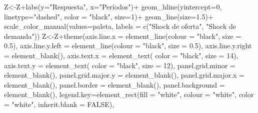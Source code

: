\documentclass[
]{book}
\newenvironment{Shaded}{\begin{snugshade}}{\end{snugshade}}
\newcommand{\AttributeTok}[1]{\textcolor[rgb]{0.77,0.63,0.00}{#1}}
\newcommand{\ConstantTok}[1]{\textcolor[rgb]{0.00,0.00,0.00}{#1}}
\newcommand{\DecValTok}[1]{\textcolor[rgb]{0.00,0.00,0.81}{#1}}
\newcommand{\FloatTok}[1]{\textcolor[rgb]{0.00,0.00,0.81}{#1}}
\newcommand{\FunctionTok}[1]{\textcolor[rgb]{0.00,0.00,0.00}{#1}}
\newcommand{\NormalTok}[1]{#1}
\newcommand{\OtherTok}[1]{\textcolor[rgb]{0.56,0.35,0.01}{#1}}
\newcommand{\SpecialCharTok}[1]{\textcolor[rgb]{0.00,0.00,0.00}{#1}}
\newcommand{\StringTok}[1]{\textcolor[rgb]{0.31,0.60,0.02}{#1}}
\begin{document}
\begin{Shaded}
\begin{Highlighting}[]
\NormalTok{Z}\OtherTok{\textless{}{-}}\NormalTok{Z}\SpecialCharTok{+}\FunctionTok{labs}\NormalTok{(}\AttributeTok{y=}\StringTok{"Respuesta"}\NormalTok{,}
          \AttributeTok{x=}\StringTok{"Períodos"}\NormalTok{)}\SpecialCharTok{+}
  \FunctionTok{geom\_hline}\NormalTok{(}\AttributeTok{yintercept=}\DecValTok{0}\NormalTok{, }\AttributeTok{linetype=}\StringTok{"dashed"}\NormalTok{,}
             \AttributeTok{color =} \StringTok{"black"}\NormalTok{, }\AttributeTok{size=}\DecValTok{1}\NormalTok{)}\SpecialCharTok{+}
  \FunctionTok{geom\_line}\NormalTok{(}\AttributeTok{size=}\FloatTok{1.5}\NormalTok{)}\SpecialCharTok{+}
  \FunctionTok{scale\_color\_manual}\NormalTok{(}\AttributeTok{values=}\NormalTok{paleta,}
                     \AttributeTok{labels =} \FunctionTok{c}\NormalTok{(}\StringTok{"Shock de oferta"}\NormalTok{, }
                                \StringTok{"Shock de demanda"}\NormalTok{))}
\NormalTok{Z}\OtherTok{\textless{}{-}}\NormalTok{Z}\SpecialCharTok{+}\FunctionTok{theme}\NormalTok{(}\AttributeTok{axis.line.x =} \FunctionTok{element\_line}\NormalTok{(}\AttributeTok{colour =} \StringTok{"black"}\NormalTok{, }\AttributeTok{size =} \FloatTok{0.5}\NormalTok{),}
           \AttributeTok{axis.line.y.left  =} \FunctionTok{element\_line}\NormalTok{(}\AttributeTok{colour =} \StringTok{"black"}\NormalTok{, }\AttributeTok{size =} \FloatTok{0.5}\NormalTok{),}
           \AttributeTok{axis.line.y.right =} \FunctionTok{element\_blank}\NormalTok{(),}
           \AttributeTok{axis.text.x =} \FunctionTok{element\_text}\NormalTok{( }\AttributeTok{color =} \StringTok{"black"}\NormalTok{, }\AttributeTok{size =} \DecValTok{14}\NormalTok{),}
           \AttributeTok{axis.text.y =} \FunctionTok{element\_text}\NormalTok{( }\AttributeTok{color =} \StringTok{"black"}\NormalTok{, }\AttributeTok{size =} \DecValTok{12}\NormalTok{),}
           \AttributeTok{panel.grid.minor =} \FunctionTok{element\_blank}\NormalTok{(),}
           \AttributeTok{panel.grid.major.y =} \FunctionTok{element\_blank}\NormalTok{(),}
           \AttributeTok{panel.grid.major.x =} \FunctionTok{element\_blank}\NormalTok{(),}
           \AttributeTok{panel.border =} \FunctionTok{element\_blank}\NormalTok{(),}
           \AttributeTok{panel.background =} \FunctionTok{element\_blank}\NormalTok{(),}
           \AttributeTok{legend.key=}\FunctionTok{element\_rect}\NormalTok{(}\AttributeTok{fill =} \StringTok{"white"}\NormalTok{, }\AttributeTok{colour =} \StringTok{"white"}\NormalTok{,}
                                   \AttributeTok{color =} \StringTok{"white"}\NormalTok{, }\AttributeTok{inherit.blank =} \ConstantTok{FALSE}\NormalTok{),}

\end{Highlighting}
\end{Shaded}
\end{document}
